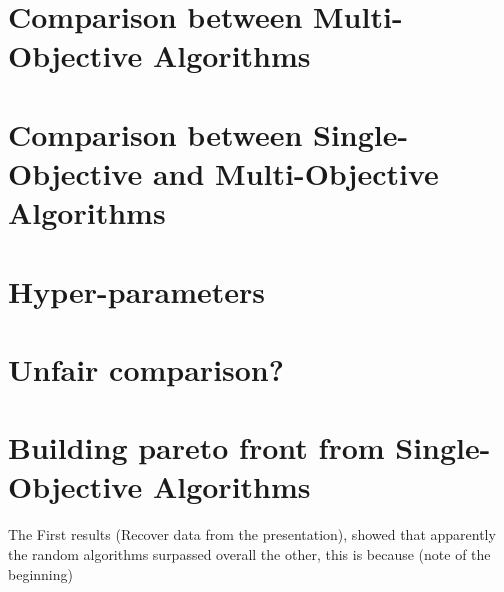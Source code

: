 \section{Comparison between Multi-Objective Algorithms}

\section{Comparison between Single-Objective and Multi-Objective Algorithms}

\section{Hyper-parameters}

\section{Unfair comparison?}

\section{Building pareto front from Single-Objective Algorithms}


The First results (Recover data from the presentation), showed that apparently the random algorithms surpassed overall the other, this is because (note of the beginning) 